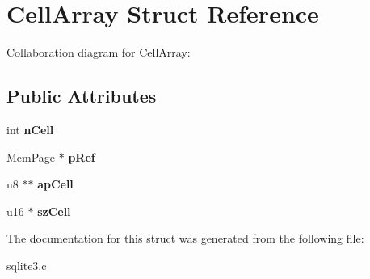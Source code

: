 \hypertarget{structCellArray}{}\section{Cell\+Array Struct Reference}
\label{structCellArray}


Collaboration diagram for Cell\+Array\+:
\subsection*{Public Attributes}
\begin{DoxyCompactItemize}
\item 
int {\bfseries n\+Cell}\hypertarget{structCellArray_a8fe33d4e52945d03ca96b4593995813d}{}\label{structCellArray_a8fe33d4e52945d03ca96b4593995813d}

\item 
\hyperlink{structMemPage}{Mem\+Page} $\ast$ {\bfseries p\+Ref}\hypertarget{structCellArray_a14046c4bbf3090696f4e6909e94fa44d}{}\label{structCellArray_a14046c4bbf3090696f4e6909e94fa44d}

\item 
u8 $\ast$$\ast$ {\bfseries ap\+Cell}\hypertarget{structCellArray_a70f7b19795ffe0c921484857721135a2}{}\label{structCellArray_a70f7b19795ffe0c921484857721135a2}

\item 
u16 $\ast$ {\bfseries sz\+Cell}\hypertarget{structCellArray_a66bb706ff8b01135461c0a9f0b72c47b}{}\label{structCellArray_a66bb706ff8b01135461c0a9f0b72c47b}

\end{DoxyCompactItemize}


The documentation for this struct was generated from the following file\+:\begin{DoxyCompactItemize}
\item 
sqlite3.\+c\end{DoxyCompactItemize}
